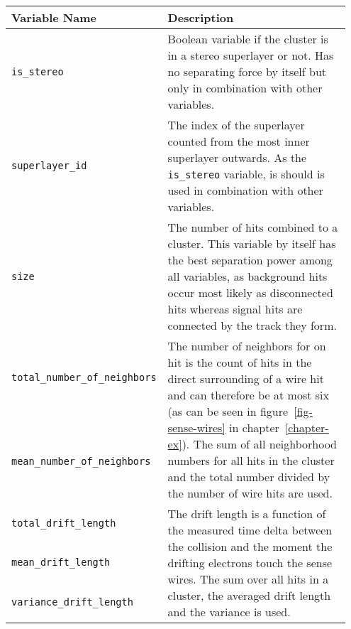 \begin{table}
  \centering
  \begin{tabular}{p{0.35\linewidth}p{0.6\linewidth}} \toprule
   Variable Name & Description \\ \midrule
   \verb+is_stereo+ & Boolean variable if the cluster is in a stereo superlayer or not. Has no separating force by itself but only in combination with other variables. \\ \midrule 
   \verb+superlayer_id+ & The index of the superlayer counted from the most inner superlayer outwards. As the \verb+is_stereo+ variable, is should is used in combination with other variables.\\ \midrule 
   
   \verb+size+ & The number of hits combined to a cluster. This variable by itself has the best separation power among all variables, as background hits occur most likely as disconnected hits whereas signal hits are connected by the track they form.  \\ \midrule 
   
   \verb+total_number_of_neighbors+ & \multirow{2}{*}[-1.5pt]{\begin{minipage}{\linewidth} The number of neighbors for on hit is the count of hits in the direct surrounding of a wire hit and can therefore be at most six (as can be seen in figure~\ref{fig-sense-wires} in chapter~\ref{chapter-ex}). The sum of all neighborhood numbers for all hits in the cluster and the total number divided by the number of wire hits are used. \end{minipage}} \\[5ex] \cmidrule{1-1}
   \verb+mean_number_of_neighbors+ & \\[5ex] \midrule 
   
   \verb+total_drift_length+ & \multirow{3}{*}[-1.5pt]{\begin{minipage}{\linewidth} The drift length is a function of the measured time delta between the collision and the moment the drifting electrons touch the sense wires. The sum over all hits in a cluster, the averaged drift length and the variance is used. \end{minipage}} \\[1ex] \cmidrule{1-1}
   \verb+mean_drift_length+ & \\[1ex] \cmidrule{1-1}
   \verb+variance_drift_length+ & \\[1ex] \midrule 
   

\end{tabular}
\end{table}

